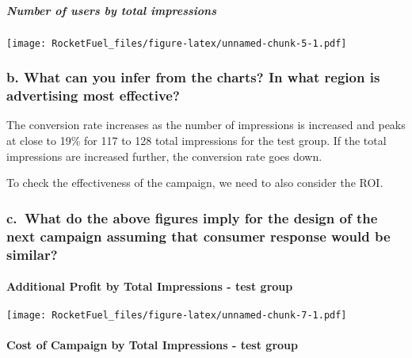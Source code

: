 \documentclass[
]{article}
\begin{document}
\hypertarget{number-of-users-by-total-impressions-1}{%
\subparagraph{Number of users by total
impressions}\label{number-of-users-by-total-impressions-1}}

\texttt{[image: RocketFuel\_files/figure-latex/unnamed-chunk-5-1.pdf]}

\hypertarget{b.-what-can-you-infer-from-the-charts-in-what-region-is-advertising-most-effective}{%
\subsubsection{b. What can you infer from the charts? In what region is
advertising most
effective?}\label{b.-what-can-you-infer-from-the-charts-in-what-region-is-advertising-most-effective}}

The conversion rate increases as the number of impressions is increased
and peaks at close to 19\% for 117 to 128 total impressions for the test
group. If the total impressions are increased further, the conversion
rate goes down.

To check the effectiveness of the campaign, we need to also consider the
ROI.

\hypertarget{c.-what-do-the-above-figures-imply-for-the-design-of-the-next-campaign-assuming-that-consumer-response-would-be-similar}{%
\subsubsection{c.~What do the above figures imply for the design of the
next campaign assuming that consumer response would be
similar?}\label{c.-what-do-the-above-figures-imply-for-the-design-of-the-next-campaign-assuming-that-consumer-response-would-be-similar}}

\hypertarget{additional-profit-by-total-impressions---test-group}{%
\paragraph{Additional Profit by Total Impressions - test
group}\label{additional-profit-by-total-impressions---test-group}}

\texttt{[image: RocketFuel\_files/figure-latex/unnamed-chunk-7-1.pdf]}

\hypertarget{cost-of-campaign-by-total-impressions---test-group}{%
\paragraph{Cost of Campaign by Total Impressions - test
group}\label{cost-of-campaign-by-total-impressions---test-group}}
\end{document}
